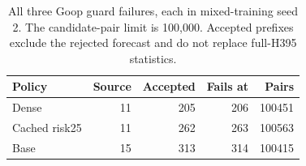 \begin{table}[!ht]\centering\small
\caption{All three Goop guard failures, each in mixed-training seed 2. The candidate-pair limit is 100,000. Accepted prefixes exclude the rejected forecast and do not replace full-H395 statistics.}
\label{tab:goop-all-failures}
\begin{tabular}{lrrrr}
\toprule
Policy & Source & Accepted & Fails at & Pairs\\
\midrule
Dense & 11 & 205 & 206 & 100451\\
Cached risk25 & 11 & 262 & 263 & 100563\\
Base & 15 & 313 & 314 & 100415\\
\bottomrule
\end{tabular}
\end{table}

